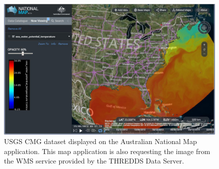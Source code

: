\documentclass[osd, online, hvmath]{copernicus}
\begin{document}
\begin{figure}
\includegraphics[width=145mm]{os-2015-64-discussions-f11.png}
\caption{USGS CMG dataset displayed on the Australian National Map
  application. This map application is also requesting the image from
  the WMS service provided by the THREDDS Data Server.}
\label{osd-2015-0064-f11.pdf}
\end{figure}
\end{document}
